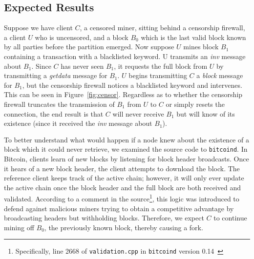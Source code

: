 \usetikzlibrary{arrows.meta}

\subsection{Expected Results}
Suppose we have client $C$, a censored miner, sitting behind a censorship firewall, a client $U$ who is uncensored, and a block $B_0$ which is the last valid block known by all parties before the partition emerged. Now suppose $U$ mines block $B_1$ containing a transaction with a blacklisted keyword. U transmits an \textit{inv} message about $B_1$. Since $C$ has never seen $B_1$, it requests the full block from $U$ by transmitting a \textit{getdata} message for $B_1$. $U$ begins transmitting $C$ a \textit{block} message for $B_1$, but the censorship firewall notices a blacklisted keyword and intervenes. This can be seen in Figure~\ref{fig:censor}.
Regardless as to whether the censorship firewall truncates the transmission of $B_1$ from $U$ to $C$ or simply resets the connection, the end result is that $C$ will never receive $B_1$ but will know of its existence (since it received the \textit{inv} message about $B_1$).

To better understand what would happen if a node knew about the existence of a block which it could never retrieve, we examined the source code to \texttt{bitcoind}. In Bitcoin, clients learn of new blocks by listening for block header broadcasts. Once it hears of a new block header, the client attempts to download the block. The reference client keeps track of the active chain; however, it will only ever update the active chain once the block header and the full block are both received and validated. According to a comment in the source\footnote{Specifically, line 2668 of \texttt{validation.cpp} in \texttt{bitcoind} version 0.14~\cite{bitcoind-source}}, this logic was introduced to defend against malicious miners trying to obtain a competitive advantage by broadcasting headers but withholding blocks. Therefore, we expect $C$ to continue mining off $B_0$, the previously known block, thereby causing a fork.

